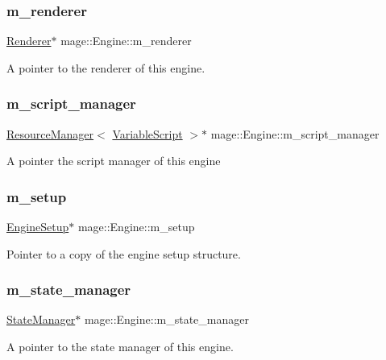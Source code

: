 \subsubsection{\texorpdfstring{m\+\_\+renderer}{m\_renderer}}
{\footnotesize\ttfamily \hyperlink{classmage_1_1_renderer}{Renderer}$\ast$ mage\+::\+Engine\+::m\+\_\+renderer\hspace{0.3cm}{\ttfamily [protected]}}

A pointer to the renderer of this engine. \hypertarget{classmage_1_1_engine_a4faf1b8f94a84be27dd63054bf6fe36d}{}\label{classmage_1_1_engine_a4faf1b8f94a84be27dd63054bf6fe36d} 
\subsubsection{\texorpdfstring{m\+\_\+script\+\_\+manager}{m\_script\_manager}}
{\footnotesize\ttfamily \hyperlink{classmage_1_1_resource_manager}{Resource\+Manager}$<$ \hyperlink{classmage_1_1_variable_script}{Variable\+Script} $>$$\ast$ mage\+::\+Engine\+::m\+\_\+script\+\_\+manager\hspace{0.3cm}{\ttfamily [protected]}}

A pointer the script manager of this engine \hypertarget{classmage_1_1_engine_a825715684015ac2a43cfc5b6bf3b083f}{}\label{classmage_1_1_engine_a825715684015ac2a43cfc5b6bf3b083f} 
\subsubsection{\texorpdfstring{m\+\_\+setup}{m\_setup}}
{\footnotesize\ttfamily \hyperlink{structmage_1_1_engine_setup}{Engine\+Setup}$\ast$ mage\+::\+Engine\+::m\+\_\+setup\hspace{0.3cm}{\ttfamily [protected]}}

Pointer to a copy of the engine setup structure. \hypertarget{classmage_1_1_engine_a7a0c463c67c3375b896809be9046113d}{}\label{classmage_1_1_engine_a7a0c463c67c3375b896809be9046113d} 
\subsubsection{\texorpdfstring{m\+\_\+state\+\_\+manager}{m\_state\_manager}}
{\footnotesize\ttfamily \hyperlink{classmage_1_1_state_manager}{State\+Manager}$\ast$ mage\+::\+Engine\+::m\+\_\+state\+\_\+manager\hspace{0.3cm}{\ttfamily [protected]}}

A pointer to the state manager of this engine. 